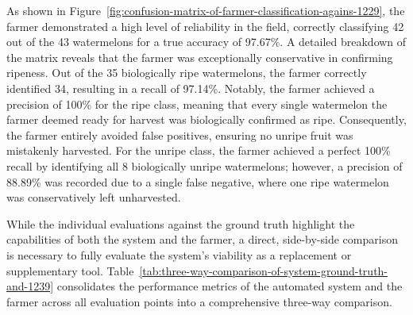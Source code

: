 \begin{thesisprose}
As shown in Figure~\ref{fig:confusion-matrix-of-farmer-classification-agains-1229}, the farmer demonstrated a high level of reliability in the field, correctly classifying 42 out of the 43 watermelons for a true accuracy of 97.67\%. A detailed breakdown of the matrix reveals that the farmer was exceptionally conservative in confirming ripeness. Out of the 35 biologically ripe watermelons, the farmer correctly identified 34, resulting in a recall of 97.14\%. Notably, the farmer achieved a precision of 100\% for the ripe class, meaning that every single watermelon the farmer deemed ready for harvest was biologically confirmed as ripe. Consequently, the farmer entirely avoided false positives, ensuring no unripe fruit was mistakenly harvested. For the unripe class, the farmer achieved a perfect 100\% recall by identifying all 8 biologically unripe watermelons; however, a precision of 88.89\% was recorded due to a single false negative, where one ripe watermelon was conservatively left unharvested.

While the individual evaluations against the ground truth highlight the capabilities of both the system and the farmer, a direct, side-by-side comparison is necessary to fully evaluate the system's viability as a replacement or supplementary tool. Table~\ref{tab:three-way-comparison-of-system-ground-truth-and-1239} consolidates the performance metrics of the automated system and the farmer across all evaluation points into a comprehensive three-way comparison.


\end{thesisprose}
